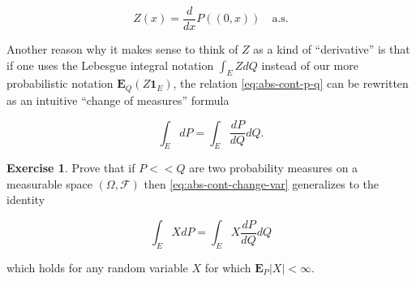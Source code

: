 \documentclass[11pt]{report}
\theoremstyle{plain}
\theoremstyle{definition}
\newtheorem{xexercise}[thm]{Exercise}
\begin{document}
\[
Z(x) = \frac{d}{dx} P((0,x)) \quad\textrm{a.s.}
\]

\noindent Another reason why it makes sense to think of $Z$ as
a kind of ``derivative'' is that if one uses the
Lebesgue integral notation $\int_E Z dQ$ instead of
our more probabilistic notation
$\mathbf{E}_{Q}(Z\mathbf{1}_E)$, the relation
\eqref{eq:abs-cont-p-q} can be rewritten as an intuitive
``change of measures'' formula

\begin{equation*} \tag{6}\label{eq:abs-cont-change-var}
\int_E dP = \int_E \frac{dP}{dQ} dQ.
\end{equation*}

\begin{xexercise}
Prove that if $P<<Q$ are two probability measures on
a measurable space $(\Omega, \mathcal{F})$ then
\eqref{eq:abs-cont-change-var} generalizes to the identity

\[
\int_E X dP = \int_E X \frac{dP}{dQ} dQ
\]

\noindent which holds for any random variable $X$ for which
$\mathbf{E}_P|X|<\infty$.
\end{xexercise}
\end{document}
